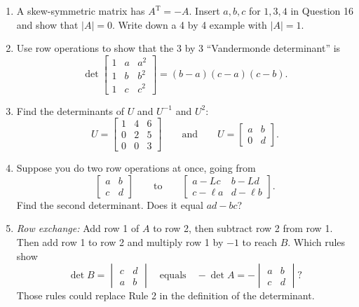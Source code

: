 \documentclass[14pt, a4paper]{article}
\begin{document}
\begin{enumerate}[resume]
    \item A skew-symmetric matrix has $A^{\mathrm{T}} = -A$. Insert $a,b,c$ for $1,3,4$ in Question 16 and show that $|A| = 0$. Write down a 4 by 4 example with $|A| = 1$.

    \item Use row operations to show that the 3 by 3 ``Vandermonde determinant'' is
          \[
              \det \begin{bmatrix} 1 & a & a^2 \\ 1 & b & b^2 \\ 1 & c & c^2 \end{bmatrix} = (b - a)(c - a)(c - b).
          \]

    \item Find the determinants of $U$ and $U^{-1}$ and $U^2$:
          \[
              U = \begin{bmatrix} 1 & 4 & 6 \\ 0 & 2 & 5 \\ 0 & 0 & 3 \end{bmatrix}
              \qquad \text{and} \qquad
              U = \begin{bmatrix} a & b \\ 0 & d \end{bmatrix}.
          \]

    \item Suppose you do two row operations at once, going from
          \[
              \begin{bmatrix} a & b \\ c & d \end{bmatrix} \qquad \text{to} \qquad \begin{bmatrix} a - Lc & b - Ld \\ c - \ell a & d - \ell b \end{bmatrix}.
          \]
          Find the second determinant. Does it equal $ad - bc$?

    \item \emph{Row exchange:} Add row 1 of $A$ to row 2, then subtract row 2 from row 1. Then add row 1 to row 2 and multiply row 1 by $-1$ to reach $B$. Which rules show
          \[
              \det B = \begin{vmatrix} c & d \\ a & b \end{vmatrix} \quad \text{equals} \quad -\det A = - \begin{vmatrix} a & b \\ c & d \end{vmatrix}?
          \]
          Those rules could replace Rule 2 in the definition of the determinant.


\end{enumerate}
\end{document}
